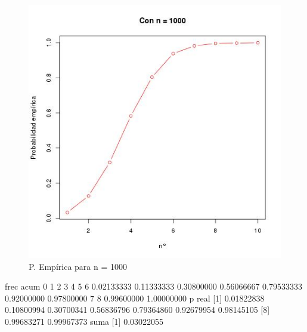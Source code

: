 \documentclass[letter,10pt]{article}
\begin{document}
\begin{itemize}
\begin{minipage}{\linewidth}
\begin{minipage}{0.45\linewidth}
\begin{figure}[H]
              \includegraphics[width=\linewidth]{p4_emp_1000.jpg}
              \caption{P. Emp\'irica para n = 1000}
          \end{figure}
      \end{minipage}
  \end{minipage}
  
  
  
  
 frec acum
         0          1          2          3          4          5          6 
0.02133333 0.11333333 0.30800000 0.56066667 0.79533333 0.92000000 0.97800000 
         7          8 
0.99600000 1.00000000 
p real
[1] 0.01822838 0.10800994 0.30700341 0.56836796 0.79364860 0.92679954 0.98145105
[8] 0.99683271 0.99967373
suma
[1] 0.03022055
 

\end{itemize}
\end{document}
